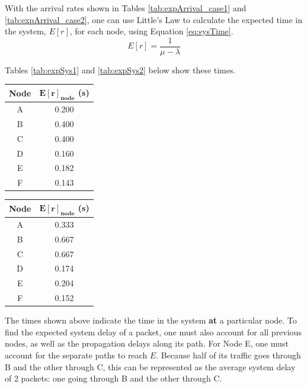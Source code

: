 \documentclass{article}
\begin{document}
With the arrival rates shown in Tables \ref{tab:expArrival_case1} and \ref{tab:expArrival_case2}, one can use Little's Law to calculate the expected time in the system, $E[r]$, for each node, using Equation \ref{eq:sysTime}.  
\begin{equation}
E[r] = \frac{1}{\mu - \lambda}
\label{eq:sysTime}
\end{equation}

Tables \ref{tab:expSys1} and \ref{tab:expSys2} below show these times.
\newline

\begin{minipage}{0.5\textwidth}
\centering
\begin{tabular}{|c|c|} \hline
\textbf{Node} & \textbf{$\mathbf{E[r]_{node}}$ (s)} \\ \hline
A & 0.200 \\ \hline
B & 0.400 \\ \hline
C & 0.400 \\ \hline
D & 0.160 \\ \hline
E & 0.182 \\ \hline
F & 0.143 \\ \hline
\end{tabular}
\label{tab:expSys1}
\end{minipage}
\begin{minipage}{0.5\textwidth}
\centering
\begin{tabular}{|c|c|} \hline
\textbf{Node} & \textbf{$\mathbf{E[r]_{node}}$ (s)} \\ \hline
A & 0.333 \\ \hline
B & 0.667 \\ \hline
C & 0.667 \\ \hline
D & 0.174 \\ \hline
E & 0.204 \\ \hline
F & 0.152 \\ \hline
\end{tabular}
\label{tab:expSys2}
\end{minipage}
\newline

The times shown above indicate the time in the system \textbf{at} a particular node.
To find the expected system delay of a packet, one must also account for all previous nodes, as well as the propagation delays along its path.
For Node E, one must account for the separate paths to reach $E$.
Because half of its traffic goes through B and the other through C, this can be represented as the average system delay of 2 packets:  one going through B and the other through C.
\end{document}
